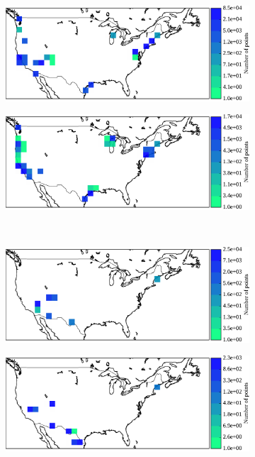\begin{figure}%
	\begin{subfigure}[b]{.45\textwidth}
	\centering
	\includegraphics[width=\textwidth]{pix/freq_COM_usa_coast.pdf}
	\end{subfigure}
	\hfill
	\begin{subfigure}[b]{.45\textwidth}
	\centering
	\includegraphics[width=\textwidth]{pix/freq_RW_usa_coast.pdf}
	\end{subfigure}
	\,
	\begin{subfigure}[b]{.45\textwidth}
	\centering
	\includegraphics[width=\textwidth]{pix/freq_COM_usa_desert.pdf}
	\end{subfigure}
	\hfill
	\begin{subfigure}[b]{.45\textwidth}
	\centering
	\includegraphics[width=\textwidth]{pix/freq_RW_usa_desert.pdf}

\end{subfigure}
\end{figure}
